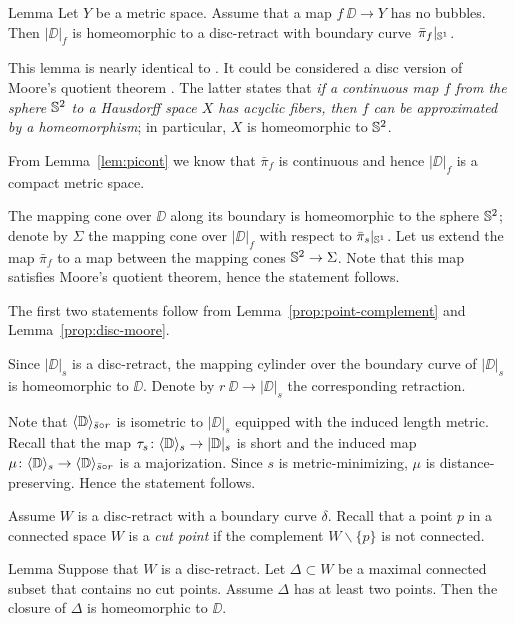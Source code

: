 \begin{thm}{Lemma}\label{prop:disc-moore}
Let $Y$ be a metric space. 
Assume that a map $f\:\DD\to Y$ has no bubbles.
Then $|\DD|_f$ is homeomorphic to a disc-retract with boundary curve~$\bar\pi_f|_{\mathbb{S}^1}$.
\end{thm}

This lemma is nearly identical to \cite[Corollary 7.12]{LW3}.
It could be considered a disc version of Moore's quotient theorem \cite{moore, daverman}.
The latter states that \textit{if a continuous map $f$ from the sphere $\mathbb{S}^2$ to a Hausdorff space $X$
has acyclic fibers, then $f$ can be approximated by a homeomorphism};
in particular, $X$ is homeomorphic to $\mathbb{S}^2$.

From Lemma~\ref{lem:picont} we know that $\bar\pi_f$ is continuous and hence $|\DD|_f$
is a compact metric space. 


The mapping cone over $\DD$ along its boundary is homeomorphic to the sphere $\mathbb{S}^2$;
denote by $\Sigma$ the mapping cone over $|\DD|_f$ with respect to $\bar\pi_s|_{\mathbb{S}^1}$.
Let us extend the map $\bar\pi_f$ to a map between the mapping cones $\mathbb{S}^2\to\Sigma$.
Note that this map satisfies Moore's quotient theorem, hence the statement follows.
\qeds

The first two statements follow from Lemma~\ref{prop:point-complement} and Lemma~\ref{prop:disc-moore}.

Since $|\DD|_s$ is a disc-retract, the mapping cylinder over the boundary curve of $|\DD|_s$ is homeomorphic to $\DD$.
Denote by $r \:\DD\to |\DD|_s$ the corresponding retraction.

Note that $\langle\mathbb{D}\rangle_{\bar s\circ r}$ is isometric to $|\DD|_s$ equipped with the induced length metric.
Recall that the map $\tau_s\colon\langle\mathbb{D}\rangle_s\to|\mathbb{D}|_s$ is short and the induced map $\mu\:\<\DD\>_s\zz\to\<\DD\>_{\bar s\circ r}$ is a majorization.
Since $s$ is metric-minimizing, $\mu$ is distance-preserving.
Hence the statement follows.
\qeds

Assume $W$ is a disc-retract with a boundary curve $\delta$.
Recall that a point $p$ in a connected space $W$ is a \emph{cut point} if the complement $W\backslash\{p\}$ is not connected.

\begin{thm}{Lemma}\label{lem:discs}
Suppose that $W$ is a disc-retract.
Let $\Delta\subset W$ be a maximal connected subset that contains no cut points.
Assume $\Delta$ has at least two points.
Then the closure of $\Delta$ is homeomorphic to $\DD$.
\end{thm}

